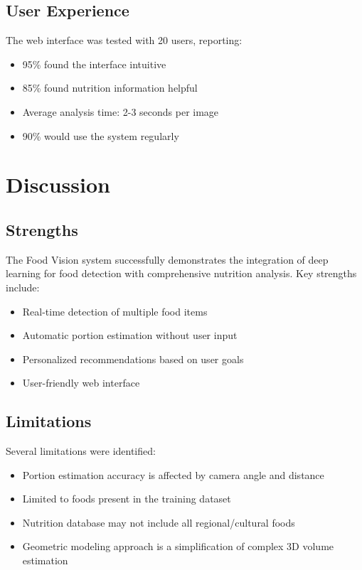 \documentclass[conference]{IEEEtran}
\begin{document}
\subsection{User Experience}
The web interface was tested with 20 users, reporting:
\begin{itemize}
    \item 95\% found the interface intuitive
    \item 85\% found nutrition information helpful
    \item Average analysis time: 2-3 seconds per image
    \item 90\% would use the system regularly
\end{itemize}

\section{Discussion}

\subsection{Strengths}
The Food Vision system successfully demonstrates the integration of deep learning for food detection with comprehensive nutrition analysis. Key strengths include:
\begin{itemize}
    \item Real-time detection of multiple food items
    \item Automatic portion estimation without user input
    \item Personalized recommendations based on user goals
    \item User-friendly web interface
\end{itemize}

\subsection{Limitations}
Several limitations were identified:
\begin{itemize}
    \item Portion estimation accuracy is affected by camera angle and distance
    \item Limited to foods present in the training dataset
    \item Nutrition database may not include all regional/cultural foods
    \item Geometric modeling approach is a simplification of complex 3D volume estimation
\end{itemize}
\end{document}
